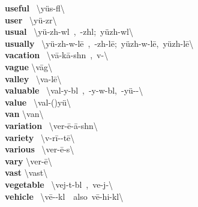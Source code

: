\documentclass[10pt,a4paper]{article}
\begin{document}
\begin{multicols}{2}
\textbf{ useful }\quad \ \textbackslash \textprimstress y\"{u}s-f\textschwa l\textbackslash \\
\textbf{ user }\quad \ \textbackslash \textprimstress y\"{u}-z\textschwa r\textbackslash \\
\textbf{ usual }\quad \ \textbackslash \textprimstress y\"{u}-zh\textschwa -w\textschwa l\ ,\ -zh\textschwa l;\ \textprimstress y\"{u}zh-w\textschwa l\textbackslash \\
\textbf{ usually }\quad \ \textbackslash \textprimstress y\"{u}-zh\textschwa -w\textschwa -l\={e}\ ,\ -zh\textschwa -l\={e};\ \textprimstress y\"{u}zh-w\textschwa -l\={e},\ \textprimstress y\"{u}zh-l\={e}\textbackslash \\
\textbf{ vacation }\quad \ \textbackslash v\={a}-\textprimstress k\={a}-sh\textschwa n\ ,\ v\textschwa -\textbackslash \\
\textbf{ vague }\quad \textbackslash \textprimstress v\={a}g\textbackslash \\
\textbf{ valley }\quad \ \textbackslash \textprimstress va-l\={e}\textbackslash \\
\textbf{ valuable }\quad \ \textbackslash \textprimstress val-y\textschwa -b\textschwa l\ ,\ -y\textschwa -w\textschwa -b\textschwa l,\ -y\"{u}-\textschwa -\textbackslash \\
\textbf{ value }\quad \ \textbackslash \textprimstress val-(\textsecstress )y\"{u}\textbackslash \\
\textbf{ van }\quad \textbackslash \textprimstress van\textbackslash \\
\textbf{ variation }\quad \ \textbackslash \textsecstress ver-\={e}-\textprimstress \={a}-sh\textschwa n\textbackslash \\
\textbf{ variety }\quad \ \textbackslash v\textschwa -\textprimstress r\={i}-\textschwa -t\={e}\textbackslash \\
\textbf{ various }\quad \ \textbackslash \textprimstress ver-\={e}-\textschwa s\textbackslash \\
\textbf{ vary }\quad \textbackslash \textprimstress ver-\={e}\textbackslash \\
\textbf{ vast }\quad \textbackslash \textprimstress vast\textbackslash \\
\textbf{ vegetable }\quad \ \textbackslash \textprimstress vej-t\textschwa -b\textschwa l\ ,\ \textprimstress ve-j\textschwa -\textbackslash \\
\textbf{ vehicle }\quad \ \textbackslash \textprimstress v\={e}-\textschwa -k\textschwa l\ \ also\ \textprimstress v\={e}-\textsecstress hi-k\textschwa l\textbackslash \\

\end{multicols}
\end{document}
